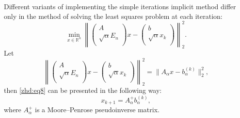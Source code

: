 Different variants of implementing the simple iterations implicit method differ only in the method of solving the least squares problem at each iteration:
\begin{equation}
\min_{x\in\mathbb{R}^{n}}\left\|\left(
                                                 \begin{array}{c}
                                                   A \\
                                                   \sqrt{\alpha}E_n  \\
                                                 \end{array}
                                               \right)x-\left(
                                                          \begin{array}{c}
                                                            b \\
                                                            \sqrt{\alpha}x_k \\
                                                          \end{array}
                                                        \right)
                                               \right\|_2^2.   
\label{zhd:eq9}
\end{equation}
Let
$$ 
\left\|\left(\begin{array}{c}
                 A \\
                 \sqrt{\alpha}E_n  \\
                  \end{array}
                  \right)x-\left(
                                                          \begin{array}{c}
                                                            b \\
                                                            \sqrt{\alpha}x_k \\
                                                          \end{array}
                                                        \right)
                                               \right\|_2^2=
  \|A_{\alpha}x-b_{\alpha}^{(k)}\|_2^2,
$$
then \eqref{zhd:eq8} can be presented in the following way:
$$ 
x_{k+1}=A_{\alpha}^{+}b_{\alpha}^{(k)}, 
$$
where $A_{\alpha}^{+}$ is a Moore--Penrose pseudoinverse matrix.

